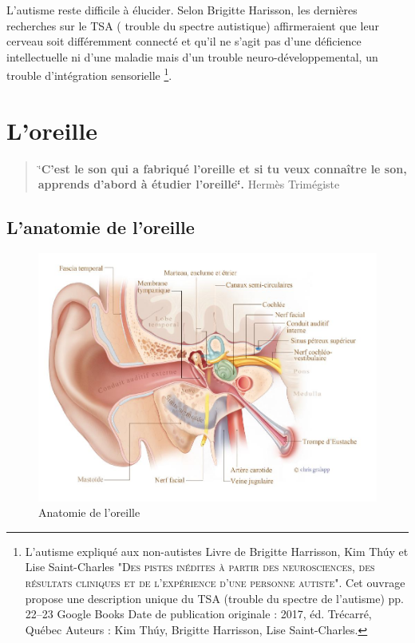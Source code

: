  L'autisme reste difficile à élucider. Selon Brigitte Harisson,  les dernières recherches sur le TSA ( trouble du spectre autistique) affirmeraient que leur cerveau soit différemment connecté et qu'il ne s'agit pas d'une déficience intellectuelle ni d'une maladie mais d'un trouble neuro-développemental, un trouble d'intégration sensorielle%
\footnote{L'autisme expliqué aux non-autistes
Livre de Brigitte Harrisson, Kim Thúy et Lise Saint-Charles
\textsc{"Des pistes inédites à partir des neurosciences, des résultats cliniques et de l'expérience d'une personne autiste".} Cet ouvrage propose une description unique du TSA (trouble du spectre de l'autisme) pp. 22--23 Google Books
Date de publication originale : 2017, éd. Trécarré, Québec
Auteurs : Kim Thúy, Brigitte Harrisson, Lise Saint-Charles.}.





\section{L'oreille}


\begin{quotation}
	\char`\"{}\textbf{C'est le son qui a fabriqué l'oreille et si tu veux connaître
		le son, apprends d'abord à étudier l\textquoteright oreille\char`\"{}.}
	Hermès Trimégiste
\end{quotation}

\subsection{L'anatomie de l'oreille}
\begin{figure}
	\centering
	\includegraphics[width=0.7\linewidth]{images/20160624Berufsfeldgruppen.jpg}
	\caption[Anatomie oreille]{Anatomie de l'oreille}
	\label{fig:-20160624berufsfeldgruppen}
\end{figure}

